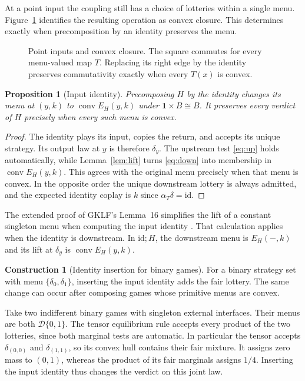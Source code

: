 \documentclass[11pt,a4paper]{article}
\newtheorem{proposition}[theorem]{Proposition}
\theoremstyle{definition}
\newtheorem*{construction}{Construction}
\newcommand{\D}{\mathcal D}
\newcommand{\Pow}{\mathcal P}
\newcommand{\conv}{\operatorname{conv}}
\newcommand{\one}{\mathbf 1}
\begin{document}
At a point input the coupling still has a choice of lotteries within a single menu. Figure~\ref{fig:unit} identifies the resulting operation as convex closure. This determines exactly when precomposition by an identity preserves the menu.

\begin{figure}[!htbp]
    \centering\small
    \caption{Point inputs and convex closure. The square commutes for every menu-valued map $T$. Replacing its right edge by the identity preserves commutativity exactly when every $T(x)$ is convex.}\label{fig:unit}
\end{figure}

\begin{proposition}[Input identity]\label{prop:unit}
    Precomposing $H$ by the identity changes its menu at $(y,k)$ to $\conv E_H(y,k)$ under $\one\times B\cong B$. It preserves every verdict of $H$ precisely when every such menu is convex.
\end{proposition}
\begin{proof}
    The identity plays its input, copies the return, and accepts its unique strategy. Its output law at $y$ is therefore $\delta_y$. The upstream test \eqref{eq:up} holds automatically, while Lemma~\ref{lem:lift} turns \eqref{eq:down} into membership in $\conv E_H(y,k)$. This agrees with the original menu precisely when that menu is convex. In the opposite order the unique downstream lottery is always admitted, and the expected identity coplay is $k$ since $\alpha_T\delta=\mathrm{id}$.
\end{proof}

The extended proof of GKLF's Lemma~16 simplifies the lift of a constant singleton menu when computing the input identity \cite[p.~15]{extended}. That calculation applies when the identity is downstream. In $\mathrm{id};H$, the downstream menu is $E_H(-,k)$ and its lift at $\delta_y$ is $\conv E_H(y,k)$.

\begin{construction}[Identity insertion for binary games]
    For a binary strategy set with menu $\{\delta_0,\delta_1\}$, inserting the input identity adds the fair lottery. The same change can occur after composing games whose primitive menus are convex.

    Take two indifferent binary games with singleton external interfaces. Their menus are both $\D\{0,1\}$. The tensor equilibrium rule \cite[Definition~5]{gklf} accepts every product of the two lotteries, since both marginal tests are automatic. In particular the tensor accepts $\delta_{(0,0)}$ and $\delta_{(1,1)}$, so its convex hull contains their fair mixture. It assigns zero mass to $(0,1)$, whereas the product of its fair marginals assigns $1/4$. Inserting the input identity thus changes the verdict on this joint law.
\end{construction}
\end{document}
